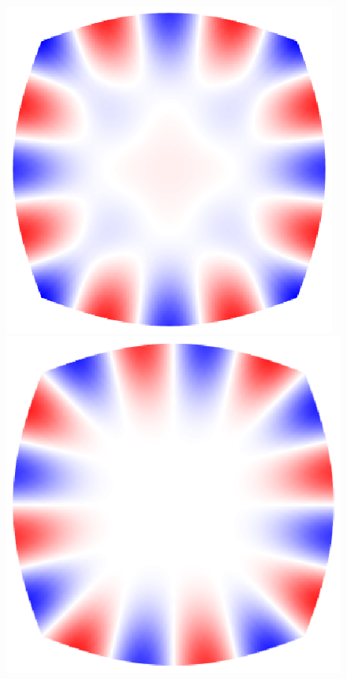 \begin{figure}
  \includegraphics[trim={0.3in 0.3in 0.3in 0.3in},clip]{../matlab/03_aero_optics_acoustics/tunnel_slices/tunnel_acoustic_against_0.6_8_0_0_006.eps}
  \includegraphics[trim={0.3in 0.3in 0.3in 0.3in},clip]{../matlab/03_aero_optics_acoustics/tunnel_slices/tunnel_acoustic_against_0.6_8_0_1.5708_006.eps} \\

\end{figure}
